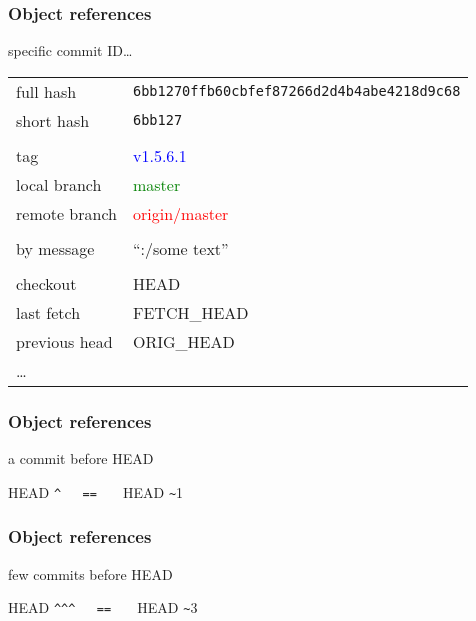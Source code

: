 \documentclass[english]{beamer}
\newcommand{\ttt}[1]{%
\texttt{\textcolor{code-black}{#1}}%
}
\newcommand{\faint}[1]{%
\textcolor{code-gray}{#1}%
}
\begin{document}
\begin{frame}
\frametitle{Object references}

specific commit ID\ldots
\vspace{\baselineskip}

{\small
\begin{tabular}{ll}
        full hash      & \ttt{6bb1270ffb60cbfef87266d2d4b4abe4218d9c68} \\
        short hash     & \ttt{6bb127} \\
        & \\
        tag            & \textcolor{blue}{v1.5.6.1} \\
        local branch   & \textcolor{green}{master} \\
        remote branch  & \textcolor{red}{origin/master} \\
        & \\
        by message     & ``:/some text'' \\
        & \\
        checkout       & HEAD \\
        last fetch     & FETCH\_HEAD \\
        previous head  & ORIG\_HEAD \\
        \ldots & \\
\end{tabular}
}

\vspace{.1\textheight}

\end{frame}

\begin{frame}[fragile]
\frametitle{Object references}

a commit before HEAD

\vspace{.1\textheight}
\begin{center}
        \faint{HEAD}\verb!^   ==   ! \faint{HEAD}\verb!~!1
\end{center}

\end{frame}

\begin{frame}[fragile]
\frametitle{Object references}

few commits before HEAD

\vspace{.1\textheight}
\begin{center}
        \faint{HEAD}\verb!^^^   ==   ! \faint{HEAD}\verb!~!3
\end{center}

\end{frame}
\end{document}
